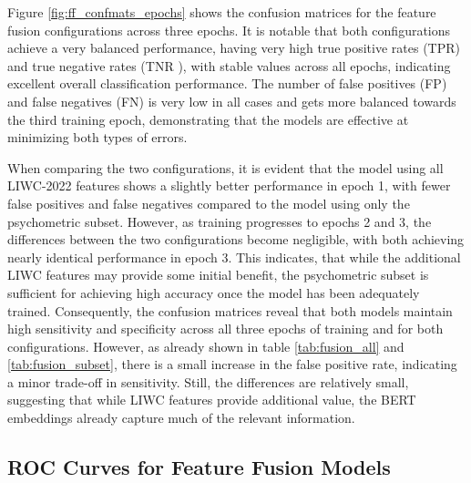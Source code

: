 Figure \ref{fig:ff_confmats_epochs} shows the confusion matrices for the feature fusion configurations across three epochs. It is notable that both configurations achieve a very balanced performance, having very high true positive rates (TPR) and true negative rates (TNR ), with stable values across all epochs, indicating excellent overall classification performance. The number of false positives (FP) and false negatives (FN) is very low in all cases and gets more balanced towards the third training epoch, demonstrating that the models are effective at minimizing both types of errors. 

When comparing the two configurations, it is evident that the model using all LIWC-2022 features shows a slightly better performance in epoch 1, with fewer false positives and false negatives compared to the model using only the psychometric subset. However, as training progresses to epochs 2 and 3, the differences between the two configurations become negligible, with both achieving nearly identical performance in epoch 3. This indicates, that while the additional LIWC features may provide some initial benefit, the psychometric subset is sufficient for achieving high accuracy once the model has been adequately trained. Consequently, the confusion matrices reveal that both models maintain high sensitivity and specificity across all three epochs of training and for both configurations.  However, as already shown in table \ref{tab:fusion_all} and \ref{tab:fusion_subset}, there is a small increase in the false positive rate, indicating a minor trade-off in sensitivity. Still, the differences are relatively small, suggesting that while LIWC features provide additional value, the BERT embeddings already capture much of the relevant information. 

\subsection{ROC Curves for Feature Fusion Models}


